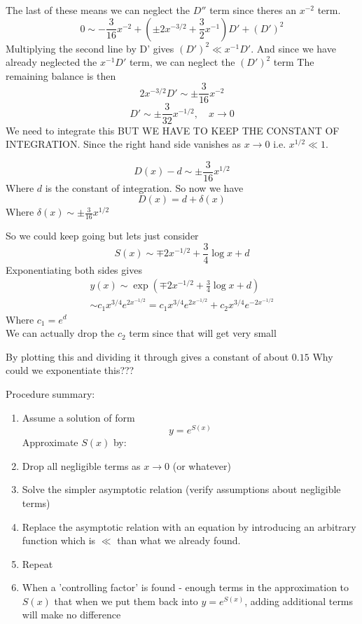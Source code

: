 \documentclass{/home/janmebows/Documents/LatexTemplates/myassignment}
\begin{document}
The last of these means we can neglect the $D''$ term since theres an $x^{-2}$ term.
\[0\sim -\frac3{16} x^{-2} + (\pm2x ^{-3/2} + \frac32 x^{-1})D' + (D')^2\]
Multiplying the second line by D' gives $(D')^2 \ll x^{-1} D'$. And since we have already neglected the $x^{-1}D'$ term, we can neglect the $(D')^2$ term
The remaining balance is then
\[2x^{-3/2} D' \sim \pm \frac3{16} x^{-2}\]
\[D' \sim \pm \frac{3}{32} x^{-1/2}, \quad x\to 0\]
We need to integrate this BUT WE HAVE TO KEEP THE CONSTANT OF INTEGRATION. Since the right hand side vanishes as $x\to 0$ i.e. $x^{1/2} \ll 1$.

\[D(x) - d \sim \pm \frac{3}{16} x^{1/2}\]
Where $d$ is the constant of integration.
So now we have 
\[D(x) = d + \delta(x)\]
Where $\delta(x) \sim \pm \frac3{16} x^{1/2}$

So we could keep going but lets just consider
\[S(x) \sim \mp 2x^{-1/2} + \frac34 \log x + d\]
Exponentiating both sides gives
\begin{align*}
    y(x) \sim \exp\left(\mp 2x^{-1/2} + \frac34 \log x + d\right)\\
    \sim c_1 x^{3/4} e^{2x^{-1/2}} = c_1 x^{3/4} e^{2x^{-1/2}} + c_2 x^{3/4} e^{-2x^{-1/2}}
\end{align*}
Where $c_1 =e^d$\\
We can actually drop the $c_2$ term since that will get very small

By plotting this and dividing it through gives a constant of about $0.15$
Why could we exponentiate this???


Procedure summary:
\begin{enumerate}
    \item Assume a solution of form
    \[y= e^{S(x)}\]
    Approximate $S(x)$ by:
    \item Drop all negligible terms as $x\to 0$ (or whatever)
    \item Solve the simpler asymptotic relation (verify assumptions about negligible terms)
    \item Replace the asymptotic relation with an equation by introducing an arbitrary function which is $\ll$ than what we already found.
    \item Repeat
    \item When a 'controlling factor' is found - enough terms in the approximation to $S(x)$ that when we put them back into $y=e^{S(x)}$, adding additional terms will make no difference
\end{enumerate}
    
    
    
\end{document}
